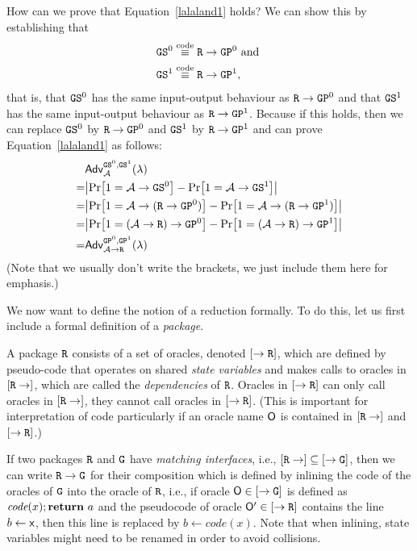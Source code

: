 How can we prove that Equation~\ref{lalaland1} holds? We can show this by establishing that
\begin{align}
\notag          &\text{\texttt{GS}}^0\stackrel{\text{code}}{\equiv}\text{\texttt{R}}\rightarrow\text{\texttt{GP}}^0\text{ and }\\
\label{lalaland}&\text{\texttt{GS}}^1\stackrel{\text{code}}{\equiv}\text{\texttt{R}}\rightarrow\text{\texttt{GP}}^1,
\end{align}
that is, that $\text{\texttt{GS}}^0$ has the same input-output behaviour as $\text{\texttt{R}}\rightarrow\text{\texttt{GP}}^0$
and that $\text{\texttt{GS}}^1$ has the same input-output behaviour as $\text{\texttt{R}}\rightarrow\text{\texttt{GP}}^1$.
Because if this holds, then we can replace $\text{\texttt{GS}}^0$ by $\text{\texttt{R}}\rightarrow\text{\texttt{GP}}^0$
and $\text{\texttt{GS}}^1$ by $\text{\texttt{R}}\rightarrow\text{\texttt{GP}}^1$ and can prove Equation~\ref{lalaland1} as follows:
\begin{align*}
&\mathsf{Adv}^{\M{GS}^0,\M{GS}^1}_\adv(\lambda)\\
=&\abs{\prob{1=\adv\rightarrow\M{GS}^0}-\prob{1=\adv\rightarrow\M{GS}^1}}\\
=&\abs{\prob{1=\adv\rightarrow(\M{R}\rightarrow\M{GP}^0)}-\prob{1=\adv\rightarrow(\M{R}\rightarrow\M{GP}^1)}}\\
=&\abs{\prob{1=(\adv\rightarrow\M{R})\rightarrow\M{GP}^0}-\prob{1=(\adv\rightarrow\M{R})\rightarrow\M{GP}^1}}\\
=&\mathsf{Adv}^{\M{GP}^0,\M{GP}^1}_{\adv\rightarrow\M{R}}(\lambda)
\end{align*}
(Note that we usually don't write the brackets, we just include them here for emphasis.)

We now want to define the notion of a reduction formally. To do this, let us first include a formal definition of 
a \emph{package}.
\begin{definition}[Package]
A package $\text{\texttt{R}}$ consists of a set of oracles, denoted $[\rightarrow \text{\texttt{R}}]$,
which are defined by pseudo-code that operates on shared \emph{state variables} and makes calls to oracles in $[\text{\texttt{R}}\rightarrow]$,
which are called the \emph{dependencies} of $\text{\texttt{R}}$. Oracles in $[\rightarrow \text{\texttt{R}}]$
can only call oracles in $[\text{\texttt{R}}\rightarrow]$, they cannot call oracles in $[\rightarrow \text{\texttt{R}}]$.
(This is important for interpretation of code particularly if an oracle name $\mathsf{O}$ is contained 
in $[\text{\texttt{R}}\rightarrow]$ and $[\rightarrow \text{\texttt{R}}]$.)
\end{definition}
\begin{definition}
If two packages $\text{\texttt{R}}$ and $\text{\texttt{G}}$ have \emph{matching interfaces}, i.e.,
$[\text{\texttt{R}}\rightarrow]\subseteq[\rightarrow\text{\texttt{G}}]$, then we can write
$\text{\texttt{R}}\rightarrow\text{\texttt{G}}$ for their composition which is defined by
inlining the code of the oracles of $\text{\texttt{G}}$ into the oracle of $\text{\texttt{R}}$,
i.e., if oracle $\mathsf{O}\in[\rightarrow\text{\texttt{G}}]$ is defined as $\textit{code}(x);\mathbf{return}\  a$
and the pseudocode of oracle $\mathsf{O}'\in[\rightarrow\text{\texttt{R}}]$ contains the line
$b\gets \mathsf{x}$, then this line is replaced by $b\gets\textit{code}(x)$. Note that
when inlining, state variables might need to be renamed in order to avoid collisions.
\end{definition}

